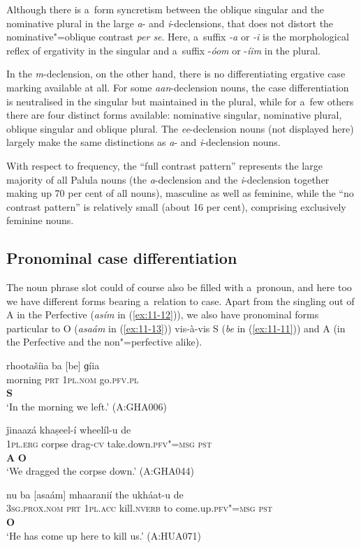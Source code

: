 Although there is a~form syncretism between the oblique singular and the nominative plural in the large \textit{a}- and \textit{i}-declensions, that does not distort the nominative"=oblique contrast \textit{per se}. Here, a~suffix \textit{-a} or \textit{-i} is the morphological reflex of ergativity in the singular and a~suffix -\textit{óom} or -\textit{íim} in the plural. 


In the \textit{m}-declension, on the other hand, there is no differentiating ergative case marking available at all. For some \textit{aan}-declension nouns, the case differentiation is neutralised in the singular but maintained in the plural, while for a~few others there are four distinct forms available: nominative singular, nominative plural, oblique singular and oblique plural. The \textit{ee}-declension nouns (not displayed here) largely make the same distinctions as \textit{a}- and \textit{i}-declension nouns.


With respect to frequency, the ``full contrast pattern'' represents the large majority of all Palula nouns (the \textit{a}-declension and the \textit{i}-declension together making up 70 per cent of all nouns), masculine as well as feminine, while the ``no contrast pattern'' is relatively small (about 16 per cent), comprising exclusively feminine nouns.


\subsection{Pronominal case differentiation}
\label{subsec:11-2-2}


The noun phrase slot could of course also be filled with a~pronoun, and here too we have different forms bearing a~relation to case. Apart from the singling out of A in the Perfective (\textit{asím} in (\ref{ex:11-12})), we also have pronominal forms particular to O (\textit{asaám} in (\ref{ex:11-13})) vis-à-vis S (\textit{be} in (\ref{ex:11-11})) and A (in the Perfective and the non"=perfective alike).

\begin{exe}
\ex
\label{ex:11-11}
\glll rhootašíia ba [be] ɡíia  \\
morning \textsc{prt} \textsc{1pl.nom} go.\textsc{pfv.pl}  \\
 {} {}  \textbf{S} \\
\glt `In the morning we left.' (A:GHA006)

\ex
\label{ex:11-12}
\glll [asím] ǰinaazá khaṣeel-í wheelíl-u de \\
\textsc{1pl.erg} corpse drag-\textsc{cv} take.down.\textsc{pfv"=msg} \textsc{pst}  \\
 \textbf{A} \textbf{O} \\
\glt `We dragged the corpse down.' (A:GHA044)

\ex
\label{ex:11-13}
\glll nu ba [asaám] mhaaranií the ukháat-u de \\
\textsc{3sg.prox.nom} \textsc{prt} \textsc{1pl.acc} kill.\textsc{nverb} to come.up.\textsc{pfv"=msg} \textsc{pst}  \\
{} {}   \textbf{O} \\
\glt `He has come up here to kill us.' (A:HUA071)
\end{exe}


